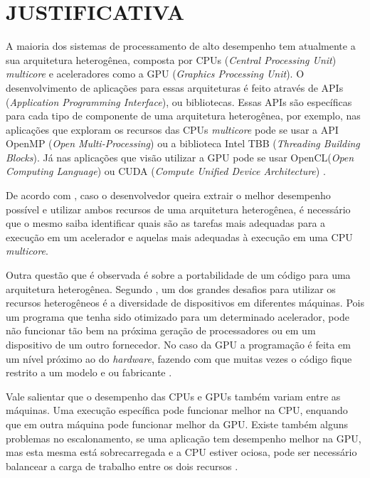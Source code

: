 
\chapter{JUSTIFICATIVA}
\label{chap:justificativa}

A maioria dos sistemas de processamento de alto desempenho tem atualmente a sua arquitetura heterogênea,
composta por CPUs (\textit{Central Processing Unit}) \textit{multicore} e aceleradores como a GPU (\textit{Graphics Processing Unit}).
O desenvolvimento de aplicações para essas arquiteturas é feito através de APIs (\textit{Application Programming Interface}), ou bibliotecas.
Essas APIs são específicas para cada tipo de componente de uma arquitetura heterogênea, por exemplo, nas aplicações que exploram os recursos
das CPUs \textit{multicore} pode se usar a API OpenMP (\textit{Open Multi-Processing}) \cite{openmp:2018} ou a biblioteca
Intel TBB \cite{inteltbb:2018} (\textit{Threading Building Blocks}).
Já nas aplicações que visão utilizar a GPU pode se usar OpenCL(\textit{Open Computing Language}) \cite{opencl:2018} ou CUDA (\textit{Compute Unified Device Architecture}) \cite{cuda:2018}.

De acordo com \cite{intrArqHete:2012}, caso o desenvolvedor queira extrair o melhor desempenho possível e utilizar ambos recursos de uma
arquitetura heterogênea, é necessário que o mesmo saiba identificar quais são as tarefas mais adequadas para a execução em um acelerador
e aquelas mais adequadas à execução em uma CPU \textit{multicore}.

Outra questão que é observada é sobre a portabilidade de um código para uma arquitetura heterogênea.
Segundo \cite{problemsArqHete:2013}, um dos grandes desafios para utilizar os recursos heterogêneos é a diversidade de dispositivos em diferentes máquinas.
Pois um programa que tenha sido otimizado para um determinado acelerador, pode não funcionar tão bem na próxima geração de processadores ou em um dispositivo de um outro fornecedor.
No caso da GPU a programação é feita em um nível próximo ao do \textit{hardware}, fazendo com que muitas vezes o código fique restrito a um modelo e ou fabricante \cite{pinto2011ambientes}.

Vale salientar que o desempenho das CPUs e GPUs também variam entre as máquinas.
Uma execução específica pode funcionar melhor na CPU, enquando que em outra máquina pode funcionar melhor da GPU.
Existe também alguns problemas no escalonamento, se uma aplicação tem desempenho melhor na GPU, mas esta mesma está sobrecarregada e a CPU estiver ociosa, pode ser necessário balancear
a carga de trabalho entre os dois recursos \cite{problemsArqHete:2013}.